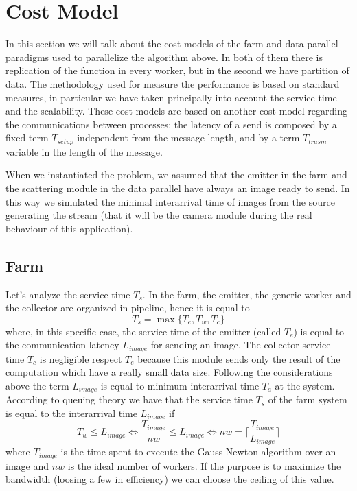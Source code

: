 \section{Cost Model}

In this section we will talk about the cost models of the farm and data parallel paradigms used to parallelize the algorithm above. In both of them there is replication of the function in every worker, but in the second we have partition of data. The methodology used for measure the performance is based on standard measures, in particular we have taken principally into account the service time and the scalability. These cost models are based on another cost model regarding the communications between processes: the latency of a send is composed by a fixed term $T_{setup}$ independent from the message length, and by a term $T_{trasm}$ variable in the length of the message.

When we instantiated the problem, we assumed that the emitter in the farm and the scattering module in the data parallel have always an image ready to send. In this way we simulated the minimal interarrival time of images from the source generating the stream (that it will be the camera module during the real behaviour of this application).

\subsection{Farm}
\label{farm_cost}

Let's analyze the service time $T_{s}$. 
In the farm, the emitter, the generic worker and the collector are organized in pipeline, hence it is equal to
\[
T_{s} = \max \lbrace T_{e}, T_{w}, T_{c}\rbrace
\]
where, in this specific case, the service time of the emitter (called $T_{e}$) is equal to the communication latency $L_{image}$ for sending an image.
The collector service time $T_{c}$ is negligible respect $T_{e}$ because this module sends only the result of the computation which have a really small data size.
Following the considerations above the term $L_{image}$ is equal to minimum interarrival time $T_{a}$ at the system. 
According to queuing theory we have that the service time $T_{s}$ of the farm system is equal to the interarrival time $L_{image}$ if
\[
T_{w} \leq L_{image} \Leftrightarrow \frac{T_{image}}{nw} \leq L_{image} \Leftrightarrow nw = \big \lceil \frac{T_{image}}{L_{image}} \big \rceil
\]
where $T_{image}$ is the time spent to execute the Gauss-Newton algorithm over an image and $nw$ is the ideal number of workers. If the purpose is to maximize the bandwidth (loosing a few in efficiency) we can choose the ceiling of this value.

